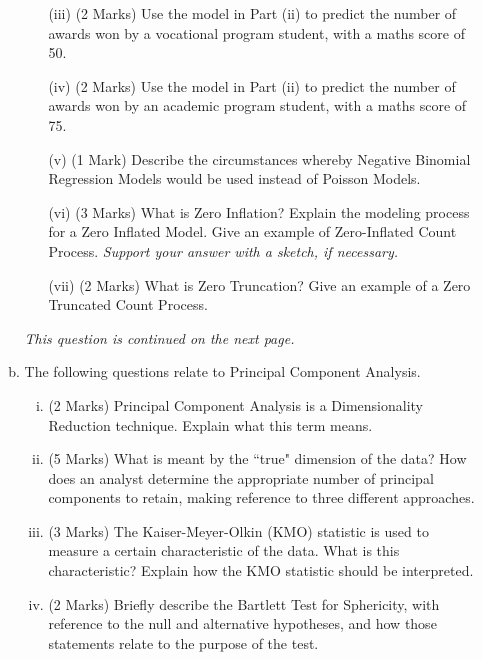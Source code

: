 \begin{enumerate}
\begin{enumerate}[(a)]
\begin{itemize}
	\item[(iii)] (2 Marks) Use the model in Part (ii) to predict the number of awards won by a vocational program student, with a maths score of 50.
	
	\item[(iv)] (2 Marks) Use the model in Part (ii) to predict the number of awards won by an academic program student, with a maths score of 75.
	
	\item[(v)] (1 Mark) Describe the circumstances whereby Negative Binomial Regression Models would be used instead of Poisson Models.	
	\item[(vi)] (3 Marks)
	What is Zero Inflation? Explain the modeling process for a Zero Inflated Model. Give an example of Zero-Inflated Count Process. \textit{Support your answer with a sketch, if necessary.}
	
	

	
	
	
	\item[(vii)] (2 Marks) What is Zero Truncation? Give an example of a Zero Truncated Count Process.
\end{itemize}
\noindent \textit{This question is continued on the next page.}
\newpage
\item 
The following questions relate to Principal Component Analysis.
\begin{enumerate}[(i)]

	\item (2 Marks) Principal Component Analysis is a Dimensionality Reduction technique. Explain what this term means.
	\item (5 Marks)	What is meant by the ``true" dimension of the data?  How does an analyst determine the appropriate number of principal components to retain, making reference to three different approaches.
	\item (3 Marks) The Kaiser-Meyer-Olkin (KMO) statistic is used to measure a certain characteristic of the data. What is this characteristic? Explain how the KMO statistic should be interpreted.
	\item (2 Marks) Briefly describe the Bartlett Test for Sphericity, with reference to the null and alternative hypotheses, and how those statements relate to the purpose of the test.
\end{enumerate} 





\end{enumerate}
\end{enumerate}
